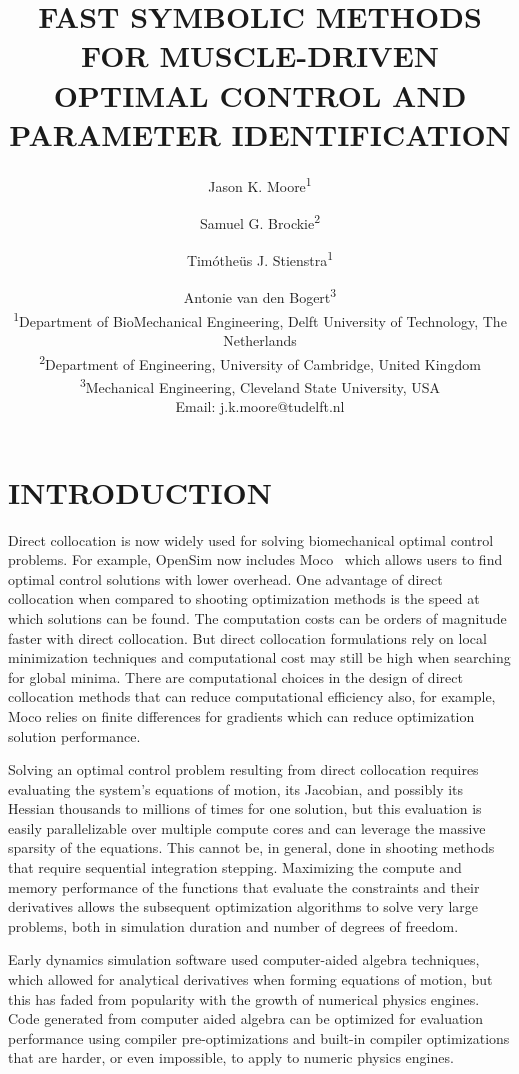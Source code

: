 \documentclass[11pt,twocolumn]{article}
\title{\textbf{
  FAST SYMBOLIC METHODS FOR MUSCLE-DRIVEN\\
  OPTIMAL CONTROL AND PARAMETER IDENTIFICATION
}}
\author{
Jason K. Moore\textsuperscript{1}\and
Samuel G. Brockie\textsuperscript{2}\and
Timótheüs J. Stienstra\textsuperscript{1}\and
Antonie van den Bogert\textsuperscript{3}\\
\textsuperscript{1}Department of BioMechanical Engineering, Delft University of Technology, The Netherlands\\
\textsuperscript{2}Department of Engineering, University of Cambridge, United Kingdom\\
\textsuperscript{3}Mechanical Engineering, Cleveland State University, USA\\
Email: j.k.moore@tudelft.nl}
\date{}
\begin{document}
\pagestyle{fancy}
\lhead{}
\maketitle
\section*{INTRODUCTION}
%
Direct collocation is now widely used for solving biomechanical optimal control
problems. For example, OpenSim now includes Moco~\cite{Dembia2019} which allows
users to find optimal control solutions with lower overhead. One advantage of
direct collocation when compared to shooting optimization methods is the speed
at which solutions can be found. The computation costs can be orders of
magnitude faster with direct collocation. But direct collocation formulations
rely on local minimization techniques and computational cost may still be high
when searching for global minima. There are computational choices in the design
of direct collocation methods that can reduce computational efficiency also, for
example, Moco relies on finite differences for gradients which can reduce
optimization solution performance.

Solving an optimal control problem resulting from direct collocation requires
evaluating the system's equations of motion, its Jacobian, and possibly its
Hessian thousands to millions of times for one solution, but this evaluation is
easily parallelizable over multiple compute cores and can leverage the massive
sparsity of the equations. This cannot be, in general, done in shooting methods
that require sequential integration stepping. Maximizing the compute and memory
performance of the functions that evaluate the constraints and their derivatives
allows the subsequent optimization algorithms to solve very large problems, both
in simulation duration and number of degrees of freedom.

Early dynamics simulation software used computer-aided algebra techniques, which
allowed for analytical derivatives when forming equations of motion, but this
has faded from popularity with the growth of numerical physics engines. Code
generated from computer aided algebra can be optimized for evaluation
performance using compiler pre-optimizations and built-in compiler optimizations
that are harder, or even impossible, to apply to numeric physics engines.
\end{document}
